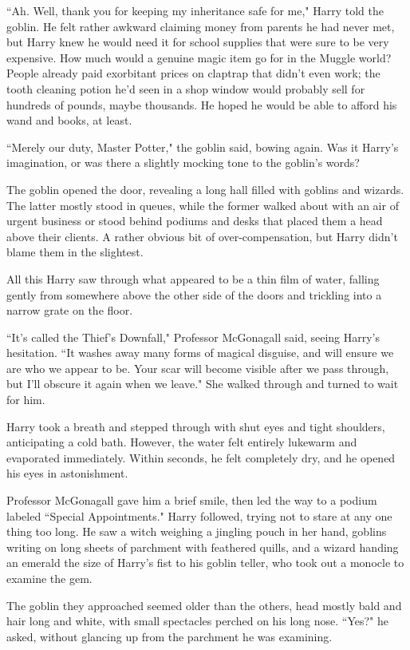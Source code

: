 ``Ah. Well, thank you for keeping my inheritance safe for me," Harry told the goblin. He felt rather awkward claiming money from parents he had never met, but Harry knew he would need it for school supplies that were sure to be very expensive. How much would a genuine magic item go for in the Muggle world? People already paid exorbitant prices on claptrap that didn't even work; the tooth cleaning potion he'd seen in a shop window would probably sell for hundreds of pounds, maybe thousands. He hoped he would be able to afford his wand and books, at least.

``Merely our duty, Master Potter," the goblin said, bowing again. Was it Harry's imagination, or was there a slightly mocking tone to the goblin's words?

The goblin opened the door, revealing a long hall filled with goblins and wizards. The latter mostly stood in queues, while the former walked about with an air of urgent business or stood behind podiums and desks that placed them a head above their clients. A rather obvious bit of over-compensation, but Harry didn't blame them in the slightest.

All this Harry saw through what appeared to be a thin film of water, falling gently from somewhere above the other side of the doors and trickling into a narrow grate on the floor.

``It's called the Thief's Downfall," Professor McGonagall said, seeing Harry's hesitation. ``It washes away many forms of magical disguise, and will ensure we are who we appear to be. Your scar will become visible after we pass through, but I'll obscure it again when we leave." She walked through and turned to wait for him.

Harry took a breath and stepped through with shut eyes and tight shoulders, anticipating a cold bath. However, the water felt entirely lukewarm and evaporated immediately. Within seconds, he felt completely dry, and he opened his eyes in astonishment.

Professor McGonagall gave him a brief smile, then led the way to a podium labeled ``Special Appointments." Harry followed, trying not to stare at any one thing too long. He saw a witch weighing a jingling pouch in her hand, goblins writing on long sheets of parchment with feathered quills, and a wizard handing an emerald the size of Harry's fist to his goblin teller, who took out a monocle to examine the gem.

The goblin they approached seemed older than the others, head mostly bald and hair long and white, with small spectacles perched on his long nose. ``Yes?" he asked, without glancing up from the parchment he was examining.

